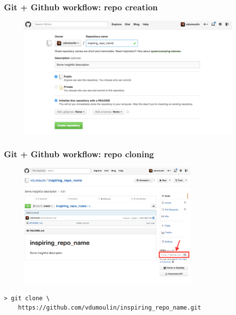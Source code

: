 \documentclass[mathserif, xcolor=dvipsnames]{beamer}
\begin{document}
\begin{frame}
    \frametitle{Git + Github workflow: repo creation}
    \begin{figure}[H]
        \includegraphics[width=\textwidth]{repo_creation_2.png}
    \end{figure}
\end{frame}

\begin{frame}[fragile]
    \frametitle{Git + Github workflow: repo cloning}
    \begin{figure}[H]
        \includegraphics[width=0.8\textwidth]{repo_cloning.png}
    \end{figure}
\begin{lstlisting}
> git clone \
    https://github.com/vdumoulin/inspiring_repo_name.git
\end{lstlisting}
\end{frame}
\end{document}
